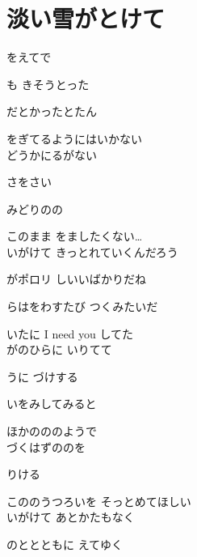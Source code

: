 \section{ 淡い雪がとけて}
\large{

をえてで

も きそうとった

だとかったとたん

をぎてるようにはいかない
\\

どうかにるがない

さをさい

みどりのの

このまま をましたくない…
\\

いがけて きっとれていくんだろう

がポロリ しいいばかりだね

らはをわすたび つくみたいだ

いたに I need you してた
\\

がのひらに いりてて

うに づけする

いをみしてみると

ほかのののようで
\\

づくはずののを

りける

こののうつろいを そっとめてほしい
\\

いがけて あとかたもなく

のととともに えてゆく

}
